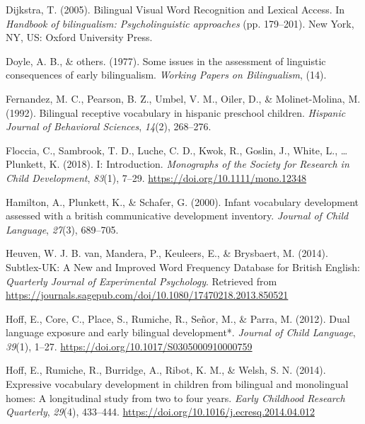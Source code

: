 \documentclass[
  english,
  man,man,floatsintext]{apa6}
\newlength{\cslhangindent}
\newenvironment{cslreferences}%
  {\setlength{\parindent}{0pt}%
  \everypar{\setlength{\hangindent}{\cslhangindent}}\ignorespaces}%
  {\par}
\begin{document}
\begin{cslreferences}
\leavevmode\hypertarget{ref-dijkstra_bilingual_2005}{}%
Dijkstra, T. (2005). Bilingual Visual Word Recognition and Lexical Access. In \emph{Handbook of bilingualism: Psycholinguistic approaches} (pp. 179--201). New York, NY, US: Oxford University Press.

\leavevmode\hypertarget{ref-doyle1977some}{}%
Doyle, A. B., \& others. (1977). Some issues in the assessment of linguistic consequences of early bilingualism. \emph{Working Papers on Bilingualism}, (14).

\leavevmode\hypertarget{ref-fernandez1992bilingual}{}%
Fernandez, M. C., Pearson, B. Z., Umbel, V. M., Oiler, D., \& Molinet-Molina, M. (1992). Bilingual receptive vocabulary in hispanic preschool children. \emph{Hispanic Journal of Behavioral Sciences}, \emph{14}(2), 268--276.

\leavevmode\hypertarget{ref-floccia_i_2018}{}%
Floccia, C., Sambrook, T. D., Luche, C. D., Kwok, R., Goslin, J., White, L., \ldots{} Plunkett, K. (2018). I: Introduction. \emph{Monographs of the Society for Research in Child Development}, \emph{83}(1), 7--29. \url{https://doi.org/10.1111/mono.12348}

\leavevmode\hypertarget{ref-hamilton_infant_2000}{}%
Hamilton, A., Plunkett, K., \& Schafer, G. (2000). Infant vocabulary development assessed with a british communicative development inventory. \emph{Journal of Child Language}, \emph{27}(3), 689--705.

\leavevmode\hypertarget{ref-heuven_subtlex-uk_2014}{}%
Heuven, W. J. B. van, Mandera, P., Keuleers, E., \& Brysbaert, M. (2014). Subtlex-UK: A New and Improved Word Frequency Database for British English: \emph{Quarterly Journal of Experimental Psychology}. Retrieved from \url{https://journals.sagepub.com/doi/10.1080/17470218.2013.850521}

\leavevmode\hypertarget{ref-hoff_dual_2012}{}%
Hoff, E., Core, C., Place, S., Rumiche, R., Señor, M., \& Parra, M. (2012). Dual language exposure and early bilingual development*. \emph{Journal of Child Language}, \emph{39}(1), 1--27. \url{https://doi.org/10.1017/S0305000910000759}

\leavevmode\hypertarget{ref-hoff_expressive_2014}{}%
Hoff, E., Rumiche, R., Burridge, A., Ribot, K. M., \& Welsh, S. N. (2014). Expressive vocabulary development in children from bilingual and monolingual homes: A longitudinal study from two to four years. \emph{Early Childhood Research Quarterly}, \emph{29}(4), 433--444. \url{https://doi.org/10.1016/j.ecresq.2014.04.012}


\end{cslreferences}
\end{document}
